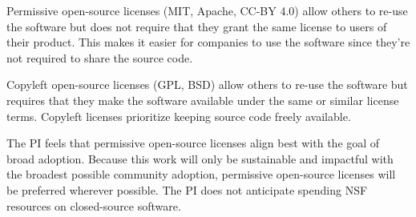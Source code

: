\documentclass[11pt,oneside]{memoir}
\begin{document}
Permissive open-source licenses (MIT, Apache, CC-BY 4.0) allow others to re-use the software but does not require that they grant the same license to users of their product.  This makes it easier for companies to use the software since they're not required to share the source code.

Copyleft open-source licenses (GPL, BSD) allow others to re-use the software but requires that they make the software available under the same or similar license terms.  Copyleft licenses prioritize keeping source code freely available.

The PI feels that permissive open-source licenses align best with the goal of broad adoption.  Because this work will only be sustainable and impactful with the broadest possible community adoption, permissive open-source licenses will be preferred wherever possible.  The PI does not anticipate spending NSF resources on closed-source software.


\end{document}
